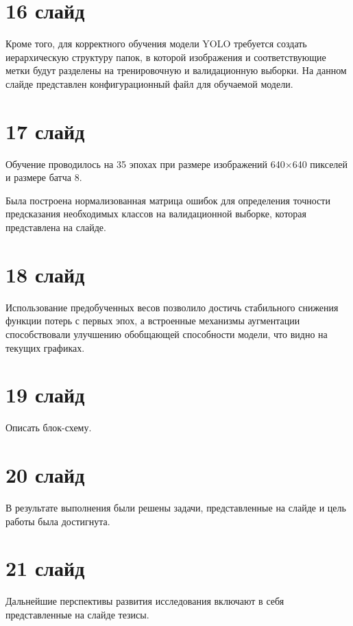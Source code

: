 \documentclass{altsu-report}
\begin{document}
\section*{16 слайд}

Кроме того, для корректного обучения модели YOLO требуется создать иерархическую 
структуру папок, в которой изображения и соответствующие метки будут разделены на 
тренировочную и валидационную выборки. На данном слайде представлен 
конфигурационный файл для обучаемой модели.

\section*{17 слайд}

Обучение проводилось на 35 эпохах при размере изображений 640×640 пикселей и 
размере батча 8.

Была построена нормализованная матрица ошибок для определения точности 
предсказания необходимых классов на валидационной выборке, которая представлена 
на слайде.

\section*{18 слайд}

Использование предобученных весов позволило достичь стабильного снижения функции 
потерь с первых эпох, а встроенные механизмы аугментации способствовали улучшению 
обобщающей способности модели, что видно на текущих графиках.

\section*{19 слайд}

Описать блок-схему.

\section*{20 слайд}

В результате выполнения были решены задачи, представленные на слайде и цель 
работы была достигнута.

\section*{21 слайд}

Дальнейшие перспективы развития исследования включают в себя представленные на 
слайде тезисы.
\end{document}
